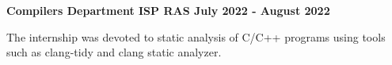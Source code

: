\textbf{{Compilers Department ISP RAS} \hfill July 2022 - August 2022} \par

\begin{itemize}
    The internship was devoted to static analysis of C/C++ programs using tools such as clang-tidy and clang static analyzer.
\end{itemize} \par